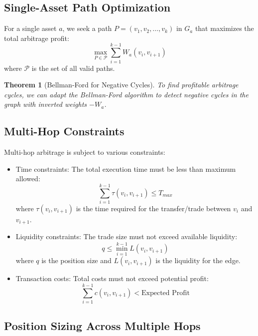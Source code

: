 \documentclass{article}
\newtheorem{theorem}{Theorem}
\begin{document}
\subsection{Single-Asset Path Optimization}

For a single asset $a$, we seek a path $P = (v_1, v_2, \ldots, v_k)$ in $G_a$ that maximizes the total arbitrage profit:
\begin{equation}
\max_{P \in \mathcal{P}} \sum_{i=1}^{k-1} W_a(v_i, v_{i+1})
\end{equation}
where $\mathcal{P}$ is the set of all valid paths.

\begin{theorem}[Bellman-Ford for Negative Cycles]
To find profitable arbitrage cycles, we can adapt the Bellman-Ford algorithm to detect negative cycles in the graph with inverted weights $-W_a$.
\end{theorem}

\subsection{Multi-Hop Constraints}

Multi-hop arbitrage is subject to various constraints:
\begin{itemize}
    \item Time constraints: The total execution time must be less than maximum allowed:
    \begin{equation}
    \sum_{i=1}^{k-1} \tau(v_i, v_{i+1}) \leq T_{max}
    \end{equation}
    where $\tau(v_i, v_{i+1})$ is the time required for the transfer/trade between $v_i$ and $v_{i+1}$.
    
    \item Liquidity constraints: The trade size must not exceed available liquidity:
    \begin{equation}
    q \leq \min_{i=1}^{k-1} L(v_i, v_{i+1})
    \end{equation}
    where $q$ is the position size and $L(v_i, v_{i+1})$ is the liquidity for the edge.
    
    \item Transaction costs: Total costs must not exceed potential profit:
    \begin{equation}
    \sum_{i=1}^{k-1} c(v_i, v_{i+1}) < \text{Expected Profit}
    \end{equation}
\end{itemize}

\subsection{Position Sizing Across Multiple Hops}
\end{document}

